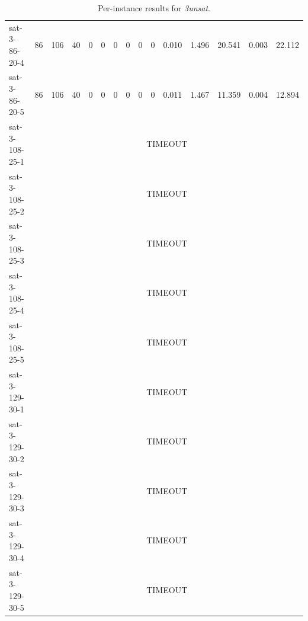 \begin{table}[H]
{\begin{tabular}{lrrr rr rr rr rrrrr}
            sat-3-86-20-4    & 86                                    & 106             & 40          & 0           & 0            & 0 & 0 & 0 & 0 & 0.010 & 1.496 & 20.541 & 0.003 & 22.112 \\
            sat-3-86-20-5    & 86                                    & 106             & 40          & 0           & 0            & 0 & 0 & 0 & 0 & 0.011 & 1.467 & 11.359 & 0.004 & 12.894 \\
            sat-3-108-25-1   & \multicolumn{14}{c}{TIMEOUT}                                                                                                                                 \\
            sat-3-108-25-2   & \multicolumn{14}{c}{TIMEOUT}                                                                                                                                 \\
            sat-3-108-25-3   & \multicolumn{14}{c}{TIMEOUT}                                                                                                                                 \\
            sat-3-108-25-4   & \multicolumn{14}{c}{TIMEOUT}                                                                                                                                 \\
            sat-3-108-25-5   & \multicolumn{14}{c}{TIMEOUT}                                                                                                                                 \\
            sat-3-129-30-1   & \multicolumn{14}{c}{TIMEOUT}                                                                                                                                 \\
            sat-3-129-30-2   & \multicolumn{14}{c}{TIMEOUT}                                                                                                                                 \\
            sat-3-129-30-3   & \multicolumn{14}{c}{TIMEOUT}                                                                                                                                 \\
            sat-3-129-30-4   & \multicolumn{14}{c}{TIMEOUT}                                                                                                                                 \\
            sat-3-129-30-5   & \multicolumn{14}{c}{TIMEOUT}                                                                                                                                 \\
            \bottomrule
        \end{tabular}%
    }
    \caption{Per-instance results for \textit{3unsat}.}
    \label{tab:appendix_3unsat}
\end{table}

